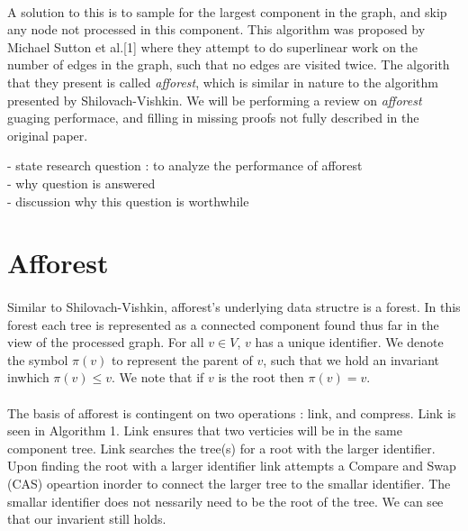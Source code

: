 \documentclass[]{article}
\begin{document}
\paragraph{}
A solution to this is to sample for the largest component in the graph, and skip any node not processed in this component.
This algorithm was proposed by Michael Sutton et al.[1] where they attempt to do superlinear work on the number of edges in the graph, such that no edges are visited twice. The algorith that they present is called \textit{afforest}, which is similar in nature to the algorithm presented by Shilovach-Vishkin. We will be performing a review on \textit{afforest} guaging performace, and filling in missing proofs not fully described in the original paper.


 - state research question : to analyze the performance of afforest\\
 - why question is answered\\
 - discussion why this question is worthwhile\\
 
 \section*{Afforest}
 \paragraph{}
 Similar to Shilovach-Vishkin, afforest's underlying data structre is a forest. In this forest each tree is represented as a connected component found thus far in the view of the processed graph. For all $v\in V$, $v$ has a unique identifier. We denote the symbol $\pi(v)$ to represent the parent of $v$, such that we hold an invariant inwhich $\pi(v)\le v$. We note that if $v$ is the root then $\pi(v) = v$.
 
 \paragraph{}
 The basis of afforest is contingent on two operations : link, and compress. Link is seen in Algorithm 1. Link ensures that two verticies will be in the same component tree. Link searches the tree(s) for a root with the larger identifier. Upon finding the root with a larger identifier link attempts a Compare and Swap (CAS) opeartion inorder to connect the larger tree to the smallar identifier. The smallar identifier does not nessarily need to be the root of the tree. We can see that our invarient still holds.
 
\end{document}
